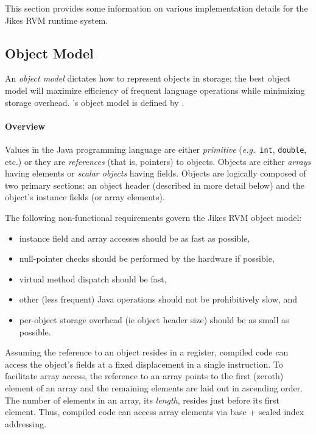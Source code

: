 This section provides some information on various
implementation details for the Jikes\TMweb{} RVM runtime system.


\subsection{Object Model}\label{sssec:objects}

An {\em object model} dictates how to represent objects in storage;
the best object model will maximize efficiency of frequent language
operations while minimizing storage overhead. \jrvm's
object model 
is defined by .

\paragraph{Overview}
Values in the Java\TMweb{} programming language are either {\em
primitive} ({\it e.g.}\ {\tt int}, {\tt double}, etc.)  or they are {\em
references} (that is, pointers) to objects.  Objects are either {\em
arrays} having elements or {\em scalar objects} having fields.
Objects are logically composed of two primary sections: an object
header (described in more detail below) and the object's instance
fields (or array elements). 

The following non-functional requirements govern the Jikes RVM object model:
\begin{itemize}
\item
instance field and array accesses should be as fast as possible,
\item
null-pointer checks should be performed by the hardware if possible, 
\item
virtual method dispatch should be fast,
\item
other (less frequent) Java operations should not be prohibitively
slow, and
\item
per-object storage overhead (ie object header size) should be as small
as possible.
\end{itemize}

Assuming the reference to an object resides in a register, compiled code can 
access the object's fields at a fixed displacement in a single
instruction.  To facilitate array access, the reference to an array
points to the first (zeroth) element of an array and the remaining
elements are laid out in ascending order.  The number of elements in
an array, its {\em length}, resides just before its first
element. Thus, compiled code can access array elements via base +
scaled index addressing.

